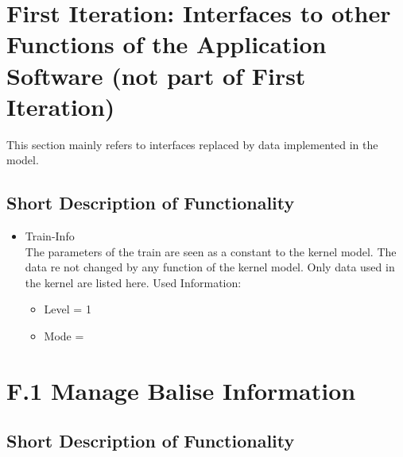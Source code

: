 \documentclass{template/openetcs_report}
\begin{document}
\section{First Iteration: Interfaces to other Functions of the Application Software (not part of First Iteration)}
This section mainly refers to interfaces replaced by data implemented in the model.

\subsection{Short Description of Functionality}

\begin{itemize}
\item Train-Info\\
The parameters of the train are seen as a constant to the kernel model. The data re not changed by any function of the kernel model. Only data used in the kernel are listed here.
Used Information:
\begin{itemize}
\item Level = 1\\
\item Mode = \\
\end{itemize}
\end{itemize}

\section{F.1 Manage Balise Information}

\subsection{Short Description of Functionality}
\end{document}
